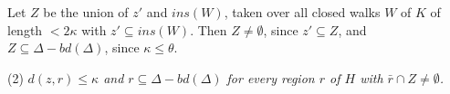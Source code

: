 Let $Z$ be the union of $z'$ and $ins(W)$, taken over all closed walks $W$ of $K$ of length $< 2\kappa$ with $z' \subseteq ins(W)$. Then $Z \ne \emptyset$, since $z' \subseteq Z$, and $Z \subseteq \Delta - bd(\Delta)$, since $\kappa \le \theta$.

\hspace*{12pt}(2) \textit{$d(z, r) \le \kappa$ and $r \subseteq \Delta - bd(\Delta)$ for every region $r$ of $H$ with $\bar{r} \cap Z \ne \emptyset$.}
